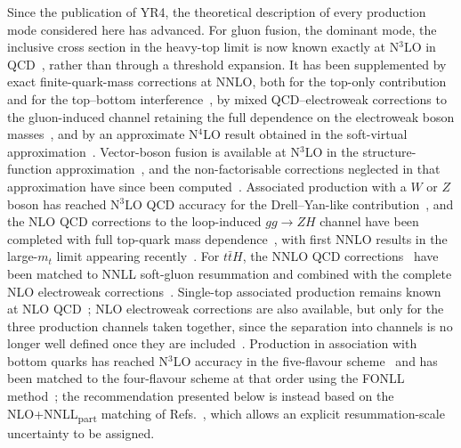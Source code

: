 Since the publication of YR4, the theoretical description of every
production mode considered here has advanced. For gluon fusion, the
dominant mode, the inclusive cross section in the heavy-top limit is
now known exactly at N$^3$LO in
QCD~\cite{Anastasiou:2015vya,Anastasiou:2016cez,Mistlberger:2018etf},
rather than through a threshold expansion. It has been supplemented by
exact finite-quark-mass corrections at NNLO, both for the top-only
contribution~\cite{Czakon:2020vql,Czakon:2021yub,Czakon:2024ywb} and
for the top--bottom interference~\cite{Czakon:2023kqm,Czakon:2024ywb},
by mixed QCD--electroweak corrections to the gluon-induced channel
retaining the full dependence on the electroweak boson
masses~\cite{Bonetti:2016brm,Bonetti:2017ovy,Bonetti:2018ukf,Becchetti:2020wof},
and by an approximate N$^4$LO result obtained in the soft-virtual
approximation~\cite{Das:2020adl}. Vector-boson fusion is available at
N$^3$LO in the structure-function approximation~\cite{Dreyer:2016oyx},
and the non-factorisable corrections neglected in that approximation
have since been computed~\cite{Liu:2019tuy,Dreyer:2020urf,Asteriadis:2023nyl}.
Associated production with a $W$ or $Z$ boson has reached N$^3$LO QCD
accuracy for the Drell--Yan-like
contribution~\cite{Baglio:2022wzu}, and the NLO QCD corrections to the
loop-induced $gg\to ZH$ channel have been completed with full
top-quark mass
dependence~\cite{Chen:2020gae,Wang:2021rxu,Chen:2022rua,Degrassi:2022mro,Davies:2025out},
with first NNLO results in the large-$m_t$ limit appearing
recently~\cite{Davies:2025otz}. For $t\bar{t}H$, the NNLO QCD
corrections~\cite{Catani:2022mfv,Devoto:2024nhl} have been matched to
NNLL soft-gluon resummation and combined with the complete NLO
electroweak corrections~\cite{Balsach:2025jcw}. Single-top associated
production remains known at NLO QCD~\cite{Demartin:2015uha,Demartin:2016axk};
NLO electroweak corrections are also available, but only for the three
production channels taken together, since the separation into channels
is no longer well defined once they are
included~\cite{Pagani:2020mov}. Production in association with bottom
quarks has reached N$^3$LO accuracy in the five-flavour
scheme~\cite{Duhr:2019kwi} and has been matched to the four-flavour
scheme at that order using the FONLL method~\cite{Duhr:2020kzd}; the
recommendation presented below is instead based on the
NLO+NNLL\textsubscript{part} matching of
Refs.~\cite{Bonvini:2015pxa,Bonvini:2016fgf}, which allows an explicit
resummation-scale uncertainty to be assigned.

